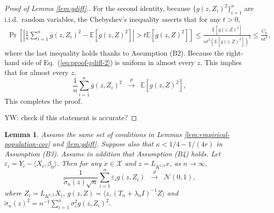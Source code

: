 \documentclass[11pt,a4paper]{article}
\renewcommand{\tilde}{\widetilde}
\renewcommand{\bar}{\overline}
\theoremstyle{definition}
\theoremstyle{plain}
\newtheorem{lemma}{Lemma}[section]
\theoremstyle{remark}
\newcommand{\mX}{\mathcal X}
\begin{document}
\begin{proof}[Proof of Lemma \ref{lem:gdiff}.]
For the second identity, because $\{g(z,Z_i)^2\}_{i=1}^n$ are i.i.d.~random variables,
the Chebyshev's inequality asserts that for any $t>0$, 
\begin{align}
\Pr\left[\left|\frac{1}{n}\sum_{i=1}^n \bar g(z,Z_i)^2 - \mathbb E[g(z,Z)^2]\right| > t\mathbb E[g(z,Z)^2]\right] \leq \frac{\mathbb E[g(z,Z)^4]}{nt^2(\mathbb E[g(z,Z)^2])^2} \leq \frac{C_p}{nt^2},
\label{eq:proof-gdiff-2}
\end{align}
where the last inequality holds thanks to Assumption (B2). 
{\color{magenta}
Because the right-hand side of Eq.~(\ref{eq:proof-gdiff-2}) is uniform in almost every $z$,
This implies that for almost every $z$,
\begin{equation*}
\frac{1}{n}\sum_{i=1}^n\bar g(z,Z_i)^2 \;\;\overset{p}{\to}\;\; \mathbb E[g(z,Z)^2],
\end{equation*} 
This completes the proof. 
}

{\color{magenta} YW: check if this statement is accurate?}
\end{proof}

\begin{lemma}
Assume the same set of conditions in Lemmas \ref{lem:empirical-population-cov} and \ref{lem:gdiff}. 
{\color{cyan}Suppose also that $\kappa < 1/4-1/(4r)$ in Assumption (B3).}
Assume in addition that Assumption (B4) holds.
Let $\varepsilon_i = Y_i - \langle X_i,\beta_0\rangle$. 
Then for any $x\in\mX$ and $z=L_{K^{1/2}}x$, as $n\to\infty$, 
$$
\frac{1}{\tilde\sigma_n(z)\sqrt{n}}\sum_{i=1}^n \varepsilon_i g(z,Z_i)\;\;\overset{d}{\to}\;\; \mathcal N(0,1),
$$
where $Z_i=L_{K^{1/2}}X_i$, $g(z,Z)=\langle z,(T_n+\lambda_n I)^{-1}Z\rangle$ and $\tilde\sigma_n(z)^2 = n^{-1}\sum_{i=1}^n \sigma_\varepsilon^2g(z,Z_i)^2$.
\label{lem:isoclt}
\end{lemma}
\end{document}
